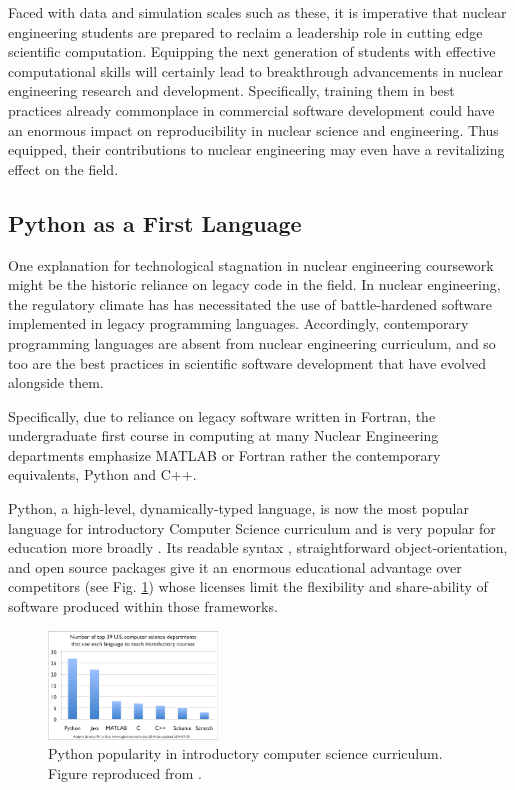 \documentclass{anstrans}
\begin{document}
Faced with data and simulation scales such as these, it is imperative
that nuclear engineering students are prepared to reclaim a leadership role in
cutting edge scientific computation. Equipping the next generation of
students with effective computational skills will certainly lead to breakthrough
advancements in nuclear engineering research and development.
Specifically, training them in best practices already commonplace in commercial
software development could have an enormous impact on reproducibility in
nuclear science and engineering. Thus equipped, their contributions to nuclear
engineering may even have a revitalizing effect on the field.

\subsection{Python as a First Language}

One explanation for technological stagnation in nuclear engineering coursework 
might be the historic reliance on legacy code in the field. In nuclear 
engineering, the regulatory climate has has necessitated the use of 
battle-hardened software implemented in legacy
programming languages. Accordingly, contemporary programming languages are
absent from nuclear engineering curriculum, and so too are the best practices in scientific
software development \cite{wilson_best_2014} that have evolved alongside them.

Specifically, due to reliance on legacy software written in Fortran, the
undergraduate first course in computing at many Nuclear Engineering departments
emphasize MATLAB or Fortran rather the contemporary equivalents, Python and C++.

Python, a high-level, dynamically-typed language, is now the most popular
language for introductory Computer Science curriculum \cite{guo_python_2014} and
is very popular for education more broadly
\cite{myers_python_2007,stajano_python_2000,backer_computational_2007}. Its
readable syntax \cite{stefik_empirical_2013}, straightforward
object-orientation, and open source packages give it an enormous educational
advantage over competitors (see Fig. \ref{fig:guo}) whose licenses limit the
flexibility and share-ability of software produced within those frameworks.

\begin{figure}[htbp!]
\begin{center}
\includegraphics[width=0.4\textwidth]{guo.eps}
\end{center}
\caption{Python popularity in introductory computer science curriculum. Figure
reproduced from \cite{guo_python_2014}. }
\label{fig:guo}
\end{figure}
\end{document}
